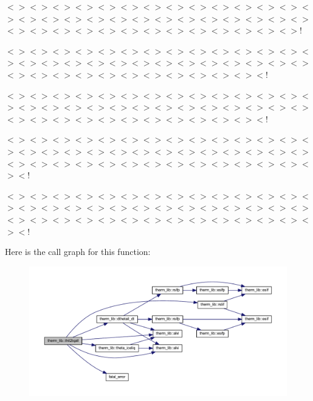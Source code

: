 $<$$>$$<$$>$$<$$>$$<$$>$$<$$>$$<$$>$$<$$>$$<$$>$$<$$>$$<$$>$$<$$>$$<$$>$$<$$>$$<$$>$$<$$>$$<$$>$$<$$>$$<$$>$$<$$>$$<$$>$$<$$>$$<$$>$$<$$>$$<$$>$$<$$>$$<$$>$$<$$>$$<$$>$$<$$>$$<$$>$$<$$>$$<$$>$$<$$>$$<$$>$$<$$>$$<$$>$$<$$>$$<$$>$$<$$>$$<$$>$!

$<$$>$$<$$>$$<$$>$$<$$>$$<$$>$$<$$>$$<$$>$$<$$>$$<$$>$$<$$>$$<$$>$$<$$>$$<$$>$$<$$>$$<$$>$$<$$>$$<$$>$$<$$>$$<$$>$$<$$>$$<$$>$$<$$>$$<$$>$$<$$>$$<$$>$$<$$>$$<$$>$$<$$>$$<$$>$$<$$>$$<$$>$$<$$>$$<$$>$$<$$>$$<$$>$$<$$>$$<$$>$$<$$>$$<$!

$<$$>$$<$$>$$<$$>$$<$$>$$<$$>$$<$$>$$<$$>$$<$$>$$<$$>$$<$$>$$<$$>$$<$$>$$<$$>$$<$$>$$<$$>$$<$$>$$<$$>$$<$$>$$<$$>$$<$$>$$<$$>$$<$$>$$<$$>$$<$$>$$<$$>$$<$$>$$<$$>$$<$$>$$<$$>$$<$$>$$<$$>$$<$$>$$<$$>$$<$$>$$<$$>$$<$$>$$<$$>$$<$$>$$<$!

$<$$>$$<$$>$$<$$>$$<$$>$$<$$>$$<$$>$$<$$>$$<$$>$$<$$>$$<$$>$$<$$>$$<$$>$$<$$>$$<$$>$$<$$>$$<$$>$$<$$>$$<$$>$$<$$>$$<$$>$$<$$>$$<$$>$$<$$>$$<$$>$$<$$>$$<$$>$$<$$>$$<$$>$$<$$>$$<$$>$$<$$>$$<$$>$$<$$>$$<$$>$$<$$>$$<$$>$$<$$>$$<$$>$$<$$>$$<$$>$$<$$>$$<$!

$<$$>$$<$$>$$<$$>$$<$$>$$<$$>$$<$$>$$<$$>$$<$$>$$<$$>$$<$$>$$<$$>$$<$$>$$<$$>$$<$$>$$<$$>$$<$$>$$<$$>$$<$$>$$<$$>$$<$$>$$<$$>$$<$$>$$<$$>$$<$$>$$<$$>$$<$$>$$<$$>$$<$$>$$<$$>$$<$$>$$<$$>$$<$$>$$<$$>$$<$$>$$<$$>$$<$$>$$<$$>$$<$$>$$<$$>$$<$$>$$<$$>$$<$! 

Here is the call graph for this function\+:\nopagebreak
\begin{figure}[H]
\begin{center}
\leavevmode
\includegraphics[width=350pt]{namespacetherm__lib_a8fda8004633d91addcf1c6004df3bd88_cgraph}
\end{center}
\end{figure}


